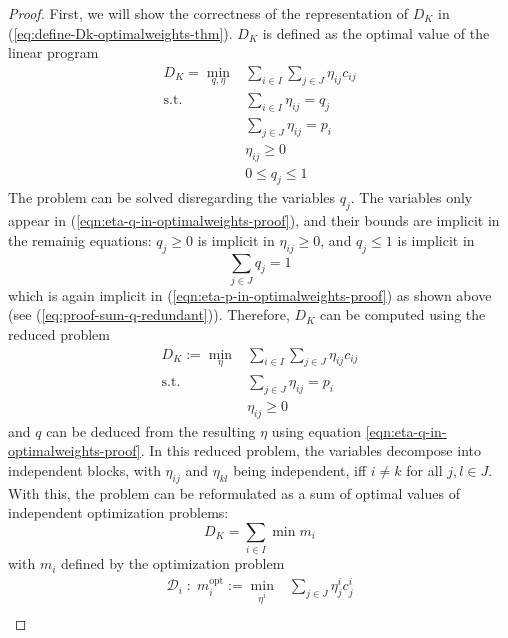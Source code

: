 \begin{proof}
First, we will show the correctness of the representation of $D_K$ in (\ref{eq:define-Dk-optimalweights-thm}).
$D_K$ is defined as the optimal value of the linear program
\begin{subequations}
\begin{align}
  D_K = \min\limits_{q, \eta}& \sum_{i\in I}\sum_{j\in J}\eta_{ij}c_{ij}\\
  \text{s.t.}&\sum_{i\in I}\eta_{ij} = q_j\label{eqn:eta-q-in-optimalweights-proof}\\
  &\sum_{j\in J}\eta_{ij} = p_i\label{eqn:eta-p-in-optimalweights-proof}\\
  &\eta_{ij} \geq 0\\
  &0 \leq q_j \leq 1
\end{align}
\end{subequations}
The problem can be solved disregarding the variables $q_j$.
The variables only appear in (\ref{eqn:eta-q-in-optimalweights-proof}), and their bounds are implicit in the remainig equations: $q_j\geq 0$ is implicit in $\eta_{ij}\geq 0$, and $q_j\leq 1$ is implicit in
\[\sum_{j\in J}q_j=1\]
which is again implicit in (\ref{eqn:eta-p-in-optimalweights-proof}) as shown above (see (\ref{eq:proof-sum-q-redundant})).
Therefore, $D_K$ can be computed using the reduced problem
\begin{subequations}
\begin{align}
  D_K := \min\limits_{\eta}& \sum_{i\in I}\sum_{j\in J}\eta_{ij}c_{ij}\\
  \text{s.t.}&\sum_{j\in J}\eta_{ij} = p_i\\
  &\eta_{ij} \geq 0
\end{align}
\end{subequations}
and $q$ can be deduced from the resulting $\eta$ using equation \eqref{eqn:eta-q-in-optimalweights-proof}.
In this reduced problem, the variables decompose into independent blocks, with $\eta_{ij}$ and $\eta_{kl}$ being independent, iff $i\neq k$ for all $j,l\in J$.
With this, the problem can be reformulated as a sum of optimal values of independent optimization problems:
\begin{equation}
  \label{eqn:Dk-decomposition-in-mi}
  D_K =  \sum_{i\in I} \min m_i
\end{equation}
with $m_i$ defined by the optimization problem
\begin{subequations}
\begin{align}
  \mathcal{D}_i\; :\; m_i^{\text{opt}} :=\min\limits_{\eta^i}&\sum_{j\in J}\eta_{j}^ic_{j}^i\\

\end{align}
\end{subequations}
\end{proof}
